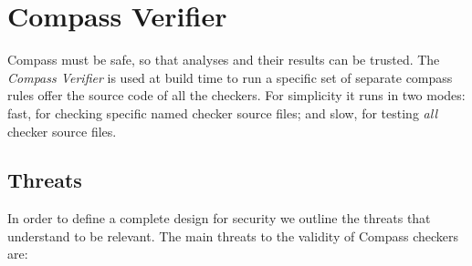\section{Compass Verifier}

Compass must be safe, so that analyses and their results can be trusted. 
The {\em Compass Verifier} is used at build time to run a specific set of separate 
compass rules offer the source code of all the checkers.  For simplicity it runs in two
modes: fast, for checking specific named checker source files; and slow, for testing 
{\em all} checker source files.

\subsection{Threats} 

In order to define a complete design for security we outline the threats that
understand to be relevant. The main threats to the validity of Compass checkers are:
